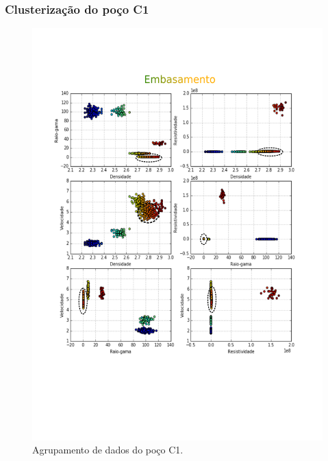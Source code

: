 \documentclass[aspectratio=10]{beamer} %
\begin{document}
\begin{frame}
\frametitle{Clusterização do poço C1}
\begin{figure}[H]
\centering
\includegraphics[scale=0.3]{Imagens/embasamentoC1.png}
\caption{Agrupamento de dados do poço C1.}
\end{figure} 
\end{frame}
\end{document}
